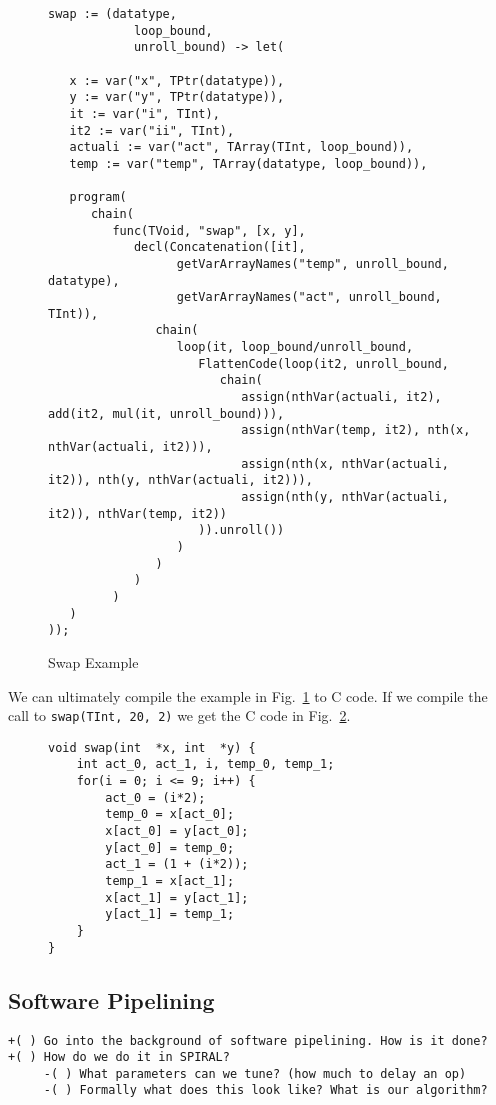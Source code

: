 \documentclass[12pt]{article}
\begin{document}
\lstset{basicstyle=\tiny}

\begin{figure}[ht]
\begin{lstlisting}
swap := (datatype,
            loop_bound,
            unroll_bound) -> let(

   x := var("x", TPtr(datatype)),
   y := var("y", TPtr(datatype)),
   it := var("i", TInt),
   it2 := var("ii", TInt),
   actuali := var("act", TArray(TInt, loop_bound)),
   temp := var("temp", TArray(datatype, loop_bound)),

   program(
      chain(
         func(TVoid, "swap", [x, y],
            decl(Concatenation([it],
                  getVarArrayNames("temp", unroll_bound, datatype),
                  getVarArrayNames("act", unroll_bound, TInt)),
               chain(
                  loop(it, loop_bound/unroll_bound,
                     FlattenCode(loop(it2, unroll_bound,
                        chain(
                           assign(nthVar(actuali, it2), add(it2, mul(it, unroll_bound))),
                           assign(nthVar(temp, it2), nth(x, nthVar(actuali, it2))),
                           assign(nth(x, nthVar(actuali, it2)), nth(y, nthVar(actuali, it2))),
                           assign(nth(y, nthVar(actuali, it2)), nthVar(temp, it2))
                     )).unroll())
                  )
               )
            )
         )
   )
));
\end{lstlisting}
\caption{Swap Example}
\label{fig:dswap}
\end{figure}

We can ultimately compile the example in Fig.~\ref{fig:dswap} to C code. If we compile the call to \texttt{swap(TInt, 20, 2)}
we get the C code in Fig.~\ref{fig:dswap_compiled}.

\begin{figure}[ht]
\begin{lstlisting}
void swap(int  *x, int  *y) {
    int act_0, act_1, i, temp_0, temp_1;
    for(i = 0; i <= 9; i++) {
        act_0 = (i*2);
        temp_0 = x[act_0];
        x[act_0] = y[act_0];
        y[act_0] = temp_0;
        act_1 = (1 + (i*2));
        temp_1 = x[act_1];
        x[act_1] = y[act_1];
        y[act_1] = temp_1;
    }
}
\end{lstlisting}
\label{fig:dswap_compiled}
\end{figure}

\subsection{Software Pipelining}
\begin{verbatim}
+( ) Go into the background of software pipelining. How is it done?
+( ) How do we do it in SPIRAL?
     -( ) What parameters can we tune? (how much to delay an op)
     -( ) Formally what does this look like? What is our algorithm?
\end{verbatim}
\end{document}
